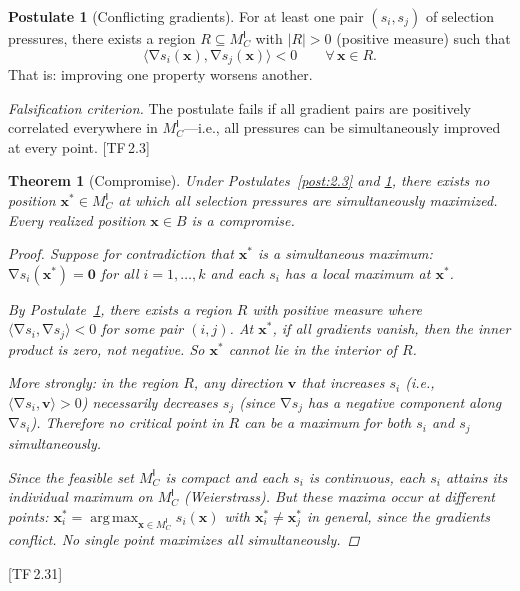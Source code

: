\documentclass[11pt, a4paper]{article}
\theoremstyle{definition}
\newtheorem{postulate}[definition]{Postulate}
\theoremstyle{plain}
\newtheorem{theorem}[definition]{Theorem}
\theoremstyle{remark}
\newcommand{\MC}{M^{\mathsf{I}}_C}          %
\newcommand{\inner}[2]{\langle #1, #2 \rangle}
\newcommand{\abs}[1]{\lvert #1 \rvert}
\DeclareMathOperator{\grad}{\nabla}
\DeclareMathOperator{\argmax}{arg\,max}
\newcommand{\TF}[1]{\textnormal{[TF\,#1]}}  %
\begin{document}
\begin{postulate}[Conflicting gradients]\label{post:2.6}
For at least one pair $(s_i, s_j)$ of selection pressures, there exists
a region $R \subseteq \MC$ with $\abs{R} > 0$ (positive measure) such
that
\[
  \inner{\grad s_i(\bm{x})}{\grad s_j(\bm{x})} < 0
  \qquad \forall\, \bm{x} \in R.
\]
That is: improving one property worsens another.

\medskip\noindent
\textit{Falsification criterion.}
The postulate fails if all gradient pairs are positively correlated
everywhere in $\MC$---i.e., all pressures can be simultaneously improved
at every point. \TF{2.3}
\end{postulate}

\begin{theorem}[Compromise]\label{thm:2.7}
Under Postulates~\ref{post:2.3} and \ref{post:2.6}, there exists no
position $\bm{x}^* \in \MC$ at which all selection pressures are
simultaneously maximized. Every realized position $\bm{x} \in B$
is a \emph{compromise}.

\begin{proof}
Suppose for contradiction that $\bm{x}^*$ is a simultaneous maximum:
$\grad s_i(\bm{x}^*) = \bm{0}$ for all $i = 1, \ldots, k$ and each
$s_i$ has a local maximum at $\bm{x}^*$.

By Postulate~\ref{post:2.6}, there exists a region $R$ with positive
measure where $\inner{\grad s_i}{\grad s_j} < 0$ for some pair $(i, j)$.
At $\bm{x}^*$, if all gradients vanish, then the inner product is zero,
not negative. So $\bm{x}^*$ cannot lie in the interior of $R$.

More strongly: in the region $R$, any direction $\bm{v}$ that increases
$s_i$ (i.e., $\inner{\grad s_i}{\bm{v}} > 0$) necessarily decreases
$s_j$ (since $\grad s_j$ has a negative component along $\grad s_i$).
Therefore no critical point in $R$ can be a maximum for both $s_i$ and
$s_j$ simultaneously.

Since the feasible set $\MC$ is compact and each $s_i$ is continuous,
each $s_i$ attains its individual maximum on $\MC$ (Weierstrass). But
these maxima occur at different points:
$\bm{x}_i^* = \argmax_{\bm{x} \in \MC} s_i(\bm{x})$ with
$\bm{x}_i^* \neq \bm{x}_j^*$ in general, since the gradients conflict.
No single point maximizes all simultaneously. \qedhere
\end{proof}
\end{theorem}

\TF{2.31}
\end{document}
